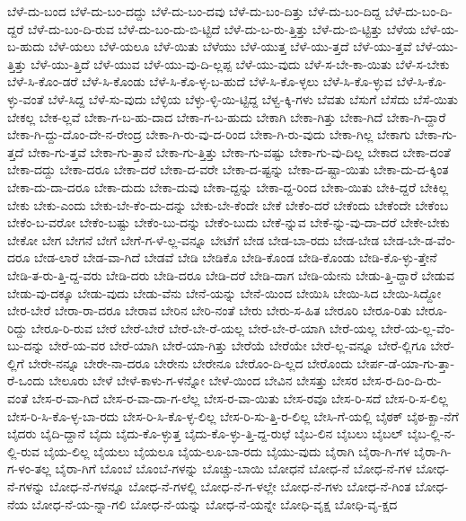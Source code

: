 {ಬೆಳೆ-ದು-ಬಂದ
ಬೆಳೆ-ದು-ಬಂ-ದದ್ದು
ಬೆಳೆ-ದು-ಬಂ-ದವು
ಬೆಳೆ-ದು-ಬಂ-ದಿತ್ತು
ಬೆಳೆ-ದು-ಬಂ-ದಿದ್ದ
ಬೆಳೆ-ದು-ಬಂ-ದಿ-ದ್ದರೆ
ಬೆಳೆ-ದು-ಬಂ-ದಿ-ರುವ
ಬೆಳೆ-ದು-ಬಂ-ದು-ಬಿ-ಟ್ಟಿದೆ
ಬೆಳೆ-ದು-ಬ-ರು-ತ್ತಿತ್ತು
ಬೆಳೆ-ದು-ಬಿ-ಟ್ಟಿತ್ತು
ಬೆಳೆಯ
ಬೆಳೆ-ಯ-ಬ-ಹುದು
ಬೆಳೆ-ಯಲು
ಬೆಳೆ-ಯಲೂ
ಬೆಳೆ-ಯಿತು
ಬೆಳೆಯು
ಬೆಳೆ-ಯುತ್ತ
ಬೆಳೆ-ಯು-ತ್ತದೆ
ಬೆಳೆ-ಯು-ತ್ತವೆ
ಬೆಳೆ-ಯು-ತ್ತಿತ್ತು
ಬೆಳೆ-ಯು-ತ್ತಿದೆ
ಬೆಳೆ-ಯುವ
ಬೆಳೆ-ಯು-ವು-ದಿ-ಲ್ಲಪ್ಪ
ಬೆಳೆ-ಯು-ವುದು
ಬೆಳೆ-ಸ-ಬೇ-ಕಾ-ಯಿತು
ಬೆಳೆ-ಸ-ಬೇಕು
ಬೆಳೆ-ಸಿ-ಕೊಂ-ಡರೆ
ಬೆಳೆ-ಸಿ-ಕೊಂಡು
ಬೆಳೆ-ಸಿ-ಕೊ-ಳ್ಳ-ಬ-ಹುದೆ
ಬೆಳೆ-ಸಿ-ಕೊ-ಳ್ಳಲು
ಬೆಳೆ-ಸಿ-ಕೊ-ಳ್ಳುವ
ಬೆಳೆ-ಸಿ-ಕೊ-ಳ್ಳು-ವಂತೆ
ಬೆಳೆ-ಸಿದ್ದ
ಬೆಳೆ-ಸು-ವುದು
ಬೆಳ್ಳಿಯ
ಬೆಳ್ಳು-ಳ್ಳಿ-ಯಿ-ಟ್ಟಿದ್ದ
ಬೆಳ್ವ-ಕ್ಕಿ-ಗಳು
ಬೆವತು
ಬೆಸುಗೆ
ಬೆಸೆದು
ಬೆಸೆ-ಯಿತು
ಬೇಕಲ್ಲ
ಬೇಕ-ಲ್ಲವೆ
ಬೇಕಾ-ಗ-ಬ-ಹು-ದಾದ
ಬೇಕಾ-ಗ-ಬ-ಹುದು
ಬೇಕಾಗಿ
ಬೇಕಾ-ಗಿತ್ತು
ಬೇಕಾ-ಗಿದೆ
ಬೇಕಾ-ಗಿ-ದ್ದಾರೆ
ಬೇಕಾ-ಗಿ-ದ್ದು-ದೊಂ-ದೇ-ನ-ರೇಂದ್ರ
ಬೇಕಾ-ಗಿ-ರು-ವು-ದ-ರಿಂದ
ಬೇಕಾ-ಗಿ-ರು-ವುದು
ಬೇಕಾ-ಗಿಲ್ಲ
ಬೇಕಾಗು
ಬೇಕಾ-ಗು-ತ್ತದೆ
ಬೇಕಾ-ಗು-ತ್ತವೆ
ಬೇಕಾ-ಗು-ತ್ತಾನೆ
ಬೇಕಾ-ಗು-ತ್ತಿತ್ತು
ಬೇಕಾ-ಗು-ವಷ್ಟು
ಬೇಕಾ-ಗು-ವು-ದಿಲ್ಲ
ಬೇಕಾದ
ಬೇಕಾ-ದಂತೆ
ಬೇಕಾ-ದದ್ದು
ಬೇಕಾ-ದರೂ
ಬೇಕಾ-ದರೆ
ಬೇಕಾ-ದ-ವರೇ
ಬೇಕಾ-ದ-ಷ್ಟನ್ನು
ಬೇಕಾ-ದ-ಷ್ಟಾ-ಯಿತು
ಬೇಕಾ-ದು-ದ-ಕ್ಕಿಂತ
ಬೇಕಾ-ದು-ದಾ-ದರೂ
ಬೇಕಾ-ದುದು
ಬೇಕಾ-ದುವು
ಬೇಕಾ-ದ್ದನ್ನು
ಬೇಕಾ-ದ್ದ-ರಿಂದ
ಬೇಕಾ-ಯಿತು
ಬೇಕಿ-ದ್ದರೆ
ಬೇಕಿಲ್ಲ
ಬೇಕು
ಬೇಕು-ಎಂದು
ಬೇಕು-ಬೇ-ಕೆಂ-ದು-ದನ್ನು
ಬೇಕು-ಬೇ-ಕೆಂದೇ
ಬೇಕೆ
ಬೇಕೆಂ-ದರೆ
ಬೇಕೆಂದು
ಬೇಕೆಂದೇ
ಬೇಕೆಂಬ
ಬೇಕೆಂ-ಬ-ವರೋ
ಬೇಕೆಂ-ಬಷ್ಟು
ಬೇಕೆಂ-ಬು-ದನ್ನು
ಬೇಕೆಂ-ಬುದು
ಬೇಕೆ-ನ್ನುವ
ಬೇಕೆ-ನ್ನು-ವು-ದಾ-ದರೆ
ಬೇಕೇ-ಬೇಕು
ಬೇಕೋ
ಬೇಗ
ಬೇಗನೆ
ಬೇಗೆ
ಬೇಗೆ-ಗ-ಳೆ-ಲ್ಲ-ವನ್ನೂ
ಬೇಟೆಗೆ
ಬೇಡ
ಬೇಡ-ಬಾ-ರದು
ಬೇಡ-ಬೇಡ
ಬೇಡ-ಬೇ-ಡ-ವೆಂ-ದರೂ
ಬೇಡ-ಲಾರೆ
ಬೇಡ-ವಾ-ಗಿದೆ
ಬೇಡವೆ
ಬೇಡಿ
ಬೇಡಿಕೊ
ಬೇಡಿ-ಕೊಂಡ
ಬೇಡಿ-ಕೊಂಡು
ಬೇಡಿ-ಕೊ-ಳ್ಳು-ತ್ತೇನೆ
ಬೇಡಿ-ತ-ರು-ತ್ತಿ-ದ್ದ-ವರು
ಬೇಡಿ-ದರು
ಬೇಡಿ-ದರೂ
ಬೇಡಿ-ದರೆ
ಬೇಡಿ-ದಾಗ
ಬೇಡಿ-ಯೇನು
ಬೇಡು-ತ್ತಿ-ದ್ದಾರೆ
ಬೇಡುವ
ಬೇಡು-ವು-ದಕ್ಕೂ
ಬೇಡು-ವುದು
ಬೇಡು-ವೆನು
ಬೇನೆ-ಯನ್ನು
ಬೇನೆ-ಯಿಂದ
ಬೇಯಿಸಿ
ಬೇಯಿ-ಸಿದ
ಬೇಯಿ-ಸಿದ್ದೋ
ಬೇರ-ಬೇರೆ
ಬೇರಾ-ರಾ-ದರೂ
ಬೇರಾವ
ಬೇರಿನ
ಬೇರಿ-ನಂತೆ
ಬೇರು
ಬೇರು-ಸ-ಹಿತ
ಬೇರೂರಿ
ಬೇರೂ-ರಿತು
ಬೇರೂ-ರಿದ್ದು
ಬೇರೂ-ರಿ-ರುವ
ಬೇರೆ
ಬೇರೆ-ಬೇರೆ
ಬೇರೆ-ಬೇ-ರೆ-ಯಲ್ಲ
ಬೇರೆ-ಬೇ-ರೆ-ಯಾಗಿ
ಬೇರೆ-ಯಲ್ಲ
ಬೇರೆ-ಯ-ಲ್ಲ-ವೆಂ-ಬು-ದನ್ನು
ಬೇರೆ-ಯ-ವರ
ಬೇರೆ-ಯಾಗಿ
ಬೇರೆ-ಯಾ-ಗಿತ್ತು
ಬೇರೆಯೆ
ಬೇರೆಯೇ
ಬೇರೆ-ಲ್ಲ-ವನ್ನೂ
ಬೇರೆ-ಲ್ಲಿಗೂ
ಬೇರೆ-ಲ್ಲಿಗೆ
ಬೇರೇ-ನನ್ನೂ
ಬೇರೇ-ನಾ-ದರೂ
ಬೇರೇನು
ಬೇರೇನೂ
ಬೇರೊಂ-ದಿ-ಲ್ಲದ
ಬೇರೊಂದು
ಬೇರ್ಪ-ಡೆ-ಯಾ-ಗು-ತ್ತಾ-ರೆ-ಒಂದು
ಬೇಲೂರು
ಬೇಳೆ
ಬೇಳೆ-ಕಾಳು-ಗ-ಳನ್ನೋ
ಬೇಳೆ-ಯಿಂದ
ಬೇವಿನ
ಬೇಸತ್ತು
ಬೇಸರ
ಬೇಸ-ರ-ದಿಂ-ದಿ-ರು-ವಂತೆ
ಬೇಸ-ರ-ವಾ-ಗಿದೆ
ಬೇಸ-ರ-ವಾ-ದಾ-ಗ-ಲೆಲ್ಲ
ಬೇಸ-ರ-ವಾ-ಯಿತು
ಬೇಸ-ರವೂ
ಬೇಸ-ರಿ-ಸದೆ
ಬೇಸ-ರಿ-ಸ-ಲಿಲ್ಲ
ಬೇಸ-ರಿ-ಸಿ-ಕೊ-ಳ್ಳ-ಬಾ-ರದು
ಬೇಸ-ರಿ-ಸಿ-ಕೊ-ಳ್ಳ-ಲಿಲ್ಲ
ಬೇಸ-ರಿ-ಸು-ತ್ತಿ-ರ-ಲಿಲ್ಲ
ಬೇಸಿ-ಗೆ-ಯಲ್ಲಿ
ಬೈಠಕ್
ಬೈಠ-ಕ್ಖಾ-ನೆಗೆ
ಬೈದರು
ಬೈದಿ-ದ್ದಾನೆ
ಬೈದು
ಬೈದು-ಕೊ-ಳ್ಳುತ್ತ
ಬೈದು-ಕೊ-ಳ್ಳು-ತ್ತಿ-ದ್ದ-ರುಛೆ
ಬೈಬ-ಲಿನ
ಬೈಬಲು
ಬೈಬಲ್
ಬೈಬ-ಲ್ಲಿ-ನ-ಲ್ಲಿ-ರುವ
ಬೈಯ-ಲಿಲ್ಲ
ಬೈಯಲು
ಬೈಯಲೂ
ಬೈಯ-ಲೂ-ಬಾ-ರದು
ಬೈಯು-ವುದು
ಬೈರಾಗಿ
ಬೈರಾ-ಗಿ-ಗಳ
ಬೈರಾ-ಗಿ-ಗ-ಳಂ-ತಲ್ಲ
ಬೈರಾ-ಗಿಗೆ
ಬೊಂಬೆ
ಬೊಂಬೆ-ಗಳನ್ನು
ಬೊಚ್ಚು-ಬಾಯಿ
ಬೋಧನೆ
ಬೋಧ-ನೆ
ಬೋಧ-ನೆ-ಗಳ
ಬೋಧ-ನೆ-ಗಳನ್ನು
ಬೋಧ-ನೆ-ಗಳನ್ನೂ
ಬೋಧ-ನೆ-ಗಳಲ್ಲಿ
ಬೋಧ-ನೆ-ಗ-ಳಲ್ಲೇ
ಬೋಧ-ನೆ-ಗಳು
ಬೋಧ-ನೆ-ಗಿಂತ
ಬೋಧ-ನೆಯ
ಬೋಧ-ನೆ-ಯ-ನ್ನಾ-ಗಲಿ
ಬೋಧ-ನೆ-ಯನ್ನು
ಬೋಧ-ನೆ-ಯನ್ನೇ
ಬೋಧಿ-ವೃಕ್ಷ
ಬೋಧಿ-ವೃ-ಕ್ಷದ
}
